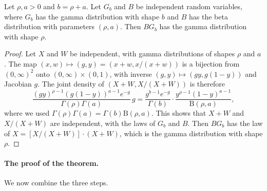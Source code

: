 \begin{lemma}\label{lem:sc-gamma-beta}
Let $\rho,a>0$ and $b=\rho+a$. Let $G_b$ and $B$ be independent random variables, where $G_b$ has the gamma distribution with shape $b$ and $B$ has the beta distribution with parameters $(\rho,a)$. Then $BG_b$ has the gamma distribution with shape $\rho$.
\end{lemma}

\begin{proof}
Let $X$ and $W$ be independent, with gamma distributions of shapes $\rho$ and $a$. The map $(x,w)\mapsto(g,y)=(x+w,x/(x+w))$ is a bijection from $(0,\infty)^2$ onto $(0,\infty)\times(0,1)$, with inverse $(g,y)\mapsto(gy,g(1-y))$ and Jacobian $g$. The joint density of $(X+W,X/(X+W))$ is therefore
\[
 \frac{(gy)^{\rho-1}(g(1-y))^{a-1}e^{-g}}{\Gamma(\rho)\Gamma(a)}\,g
 =\frac{g^{b-1}e^{-g}}{\Gamma(b)}\cdot\frac{y^{\rho-1}(1-y)^{a-1}}{\mathrm B(\rho,a)},
\]
where we used $\Gamma(\rho)\Gamma(a)=\Gamma(b)\mathrm B(\rho,a)$. This shows that $X+W$ and $X/(X+W)$ are independent, with the laws of $G_b$ and $B$. Then $BG_b$ has the law of $X=[X/(X+W)]\cdot(X+W)$, which is the gamma distribution with shape $\rho$.
\end{proof}

\paragraph{The proof of the theorem.} We now combine the three steps.

